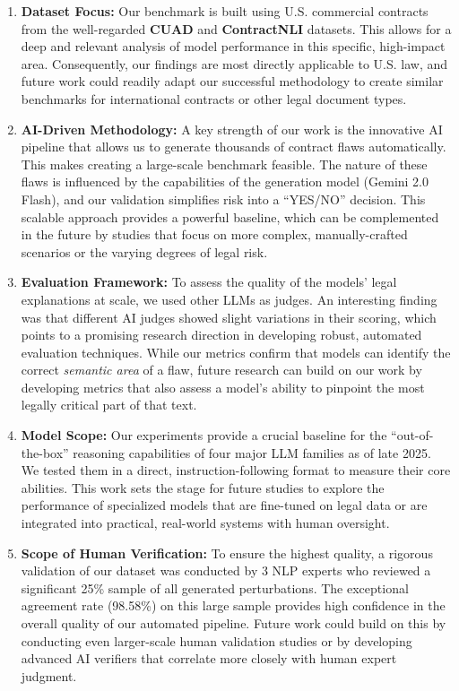 \documentclass[11pt]{article}
\begin{document}
\begin{enumerate}[leftmargin=*,itemsep=0.1em]
    \item \textbf{Dataset Focus:} Our benchmark is built using U.S. commercial contracts from the well-regarded \textbf{CUAD} and \textbf{ContractNLI} datasets. This allows for a deep and relevant analysis of model performance in this specific, high-impact area. Consequently, our findings are most directly applicable to U.S. law, and future work could readily adapt our successful methodology to create similar benchmarks for international contracts or other legal document types.

    \item \textbf{AI-Driven Methodology:} A key strength of our work is the innovative AI pipeline that allows us to generate thousands of contract flaws automatically. This makes creating a large-scale benchmark feasible. The nature of these flaws is influenced by the capabilities of the generation model (Gemini 2.0 Flash), and our validation simplifies risk into a ``YES/NO'' decision. This scalable approach provides a powerful baseline, which can be complemented in the future by studies that focus on more complex, manually-crafted scenarios or the varying degrees of legal risk.

    \item \textbf{Evaluation Framework:} To assess the quality of the models' legal explanations at scale, we used other LLMs as judges. An interesting finding was that different AI judges showed slight variations in their scoring, which points to a promising research direction in developing robust, automated evaluation techniques. While our metrics confirm that models can identify the correct \textit{semantic area} of a flaw, future research can build on our work by developing metrics that also assess a model's ability to pinpoint the most legally critical part of that text.

    \item \textbf{Model Scope:} Our experiments provide a crucial baseline for the ``out-of-the-box'' reasoning capabilities of four major LLM families as of late 2025. We tested them in a direct, instruction-following format to measure their core abilities. This work sets the stage for future studies to explore the performance of specialized models that are fine-tuned on legal data or are integrated into practical, real-world systems with human oversight.

    \item \textbf{Scope of Human Verification:} To ensure the highest quality, a rigorous validation of our dataset was conducted by 3 NLP experts who reviewed a significant 25\% sample of all generated perturbations. The exceptional agreement rate (98.58\%) on this large sample provides high confidence in the overall quality of our automated pipeline. Future work could build on this by conducting even larger-scale human validation studies or by developing advanced AI verifiers that correlate more closely with human expert judgment.


\end{enumerate}
\end{document}
